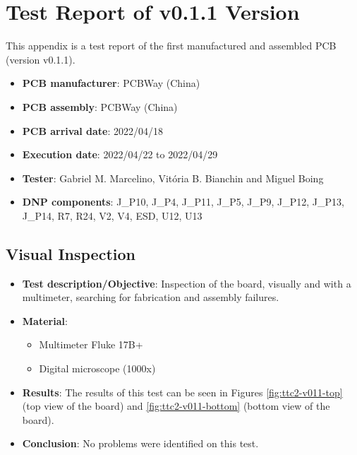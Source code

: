 %
%
%
%
%

%
%
%
%
%

\chapter{Test Report of v0.1.1 Version} \label{anx:test-report-v011}

This appendix is a test report of the first manufactured and assembled PCB (version v0.1.1).

\begin{itemize}
    \item \textbf{PCB manufacturer}: PCBWay (China)
    \item \textbf{PCB assembly}: PCBWay (China)
    \item \textbf{PCB arrival date}: 2022/04/18
    \item \textbf{Execution date}: 2022/04/22 to 2022/04/29
    \item \textbf{Tester}: Gabriel M. Marcelino, Vitória B. Bianchin and Miguel Boing
    \item \textbf{DNP components}: J\_P10, J\_P4, J\_P11, J\_P5, J\_P9, J\_P12, J\_P13, J\_P14, R7, R24, V2, V4, ESD, U12, U13
\end{itemize}

\section{Visual Inspection}

\begin{itemize}
    \item \textbf{Test description/Objective}: Inspection of the board, visually and with a multimeter, searching for fabrication and assembly failures.
    \item \textbf{Material}:
        \begin{itemize}
            \item Multimeter Fluke 17B+
            \item Digital microscope (1000x)
        \end{itemize}
    \item \textbf{Results}: The results of this test can be seen in Figures \ref{fig:ttc2-v011-top} (top view of the board) and \ref{fig:ttc2-v011-bottom} (bottom view of the board).
    \item \textbf{Conclusion}: No problems were identified on this test.
\end{itemize}

